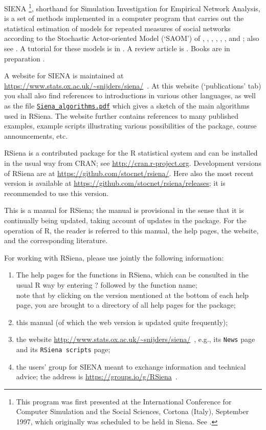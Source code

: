 \documentclass[a4paper,fleqn,11pt]{article}
\newcommand{\+}{\, + \,}
\newcommand{\sfn}[1]{\textsf{#1}}
\newcommand{\R}{{\sf R }}
\newcommand{\Rn}{{\sf R}}
\newcommand{\rs}{{\sf RSiena}}
\newcommand{\RS}{{\sf \textsf{RSiena} }}
\newcommand{\SI}{{\sf SIENA }}
\newcommand{\si}{{\sf SIENA}}
\begin{document}
\si
\footnote{This program was first presented at the
International Conference for Computer Simulation and the Social
Sciences, Cortona (Italy), September 1997, which originally was
scheduled to be held in Siena. See \citet{SnijdersDuijn97}.},
shorthand for {\sf Simulation Investigation for Empirical
Network Analysis}, is a set of methods
implemented in a computer program that carries out the
statistical estimation of models for repeated measures of social
networks according to the Stochastic Actor-oriented Model
 (`SAOM') of \citet{SnijdersDuijn97}, \citet{Snijders01},
\citet{SnijdersEA07},  \citet{SnijdersEA10a}, \citet{SLT2013},
\citet{Greenan15}, and \citet{KoskinenSnijders2023};
also see \citet{SteglichEA10}.
A tutorial for these models is in \citet{SnijdersEA10b}.
A review article is \citet{Snijders2017}.
Books are in preparation \citep{AMAND,SNDE}.

A website for \SI is maintained at
{\small\url{https://www.stats.ox.ac.uk/~snijders/siena/}~}.
At this website (`publications' tab)
you shall also find references to introductions in various other languages,
as well as the file
\href{https://www.stats.ox.ac.uk/~snijders/siena/Siena_algorithms.pdf}{\texttt{Siena\_algorithms.pdf}}
 which
gives a sketch of the main algorithms used in \rs.
The website further contains references to many published examples,
example scripts illustrating various possibilities of the package,
course announcements, etc.

\RS is a contributed package for the \R statistical system \citep{R}
and can be installed in the usual way from \sfn{CRAN};
see \url{http://cran.r-project.org}.
Development versions of \RS are at
\url{https://github.com/stocnet/rsiena/}.
Here also the most recent version is available
at \url{https://github.com/stocnet/rsiena/releases};
it is recommended to use this version.

This is a manual for \rs;
the manual is provisional in the sense
that it is continually being updated, taking account of
updates in the package. For the operation of \Rn,
the reader is referred to this manual, the help pages,
the website, and the corresponding literature.

For working with \rs, please use jointly the following
information:
\begin{enumerate}
  \item The help pages for the functions in \rs, which can be consulted
        in the usual \R way by entering ? followed by the function name;\\
        note that by clicking on the version mentioned at the bottom
        of each help page, you are brought to a directory of all help
        pages for the package;
  \item this manual (of which the web version is updated quite frequently);
  \item the website
{\small\url{http://www.stats.ox.ac.uk/~snijders/siena/}~},
        e.g., its \texttt{News} page and its \texttt{RSiena scripts} page;
  \item the users' group for \SI meant to exchange information
        and technical advice; the address is
        {\small\url{https://groups.io/g/RSiena}~}.
\end{enumerate}
\end{document}
